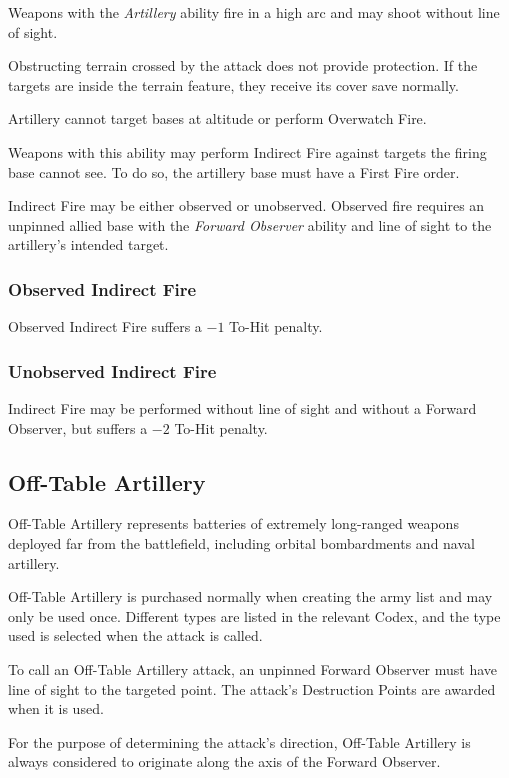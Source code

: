 Weapons with the \textit{Artillery} ability fire in a high arc and may shoot without line of sight.

Obstructing terrain crossed by the attack does not provide protection. If the targets are inside the terrain feature, they receive its cover save normally.

Artillery cannot target bases at altitude or perform Overwatch Fire.

Weapons with this ability may perform Indirect Fire against targets the firing base cannot see. To do so, the artillery base must have a First Fire order.

Indirect Fire may be either observed or unobserved. Observed fire requires an unpinned allied base with the \textit{Forward Observer} ability and line of sight to the artillery's intended target.

\subsubsection{Observed Indirect Fire}

Observed Indirect Fire suffers a $-1$ To-Hit penalty.

\subsubsection{Unobserved Indirect Fire}

Indirect Fire may be performed without line of sight and without a Forward Observer, but suffers a $-2$ To-Hit penalty.

\subsection{Off-Table Artillery}

Off-Table Artillery represents batteries of extremely long-ranged weapons deployed far from the battlefield, including orbital bombardments and naval artillery.

Off-Table Artillery is purchased normally when creating the army list and may only be used once. Different types are listed in the relevant Codex, and the type used is selected when the attack is called.

To call an Off-Table Artillery attack, an unpinned Forward Observer must have line of sight to the targeted point. The attack's Destruction Points are awarded when it is used.

For the purpose of determining the attack's direction, Off-Table Artillery is always considered to originate along the axis of the Forward Observer.

